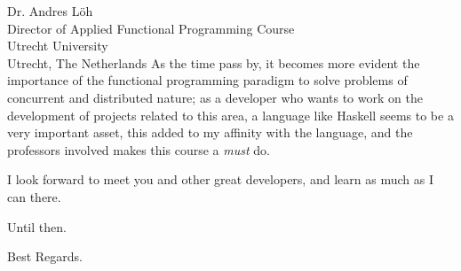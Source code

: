 \documentclass{letter} %
\begin{document}
\begin{letter}{Dr. Andres L\"oh \\
Director of Applied Functional Programming Course \\
Utrecht University \\
Utrecht, The Netherlands}
\noindent As the time pass by, it becomes more evident the importance of the functional programming paradigm 
to solve problems of concurrent and distributed nature; as a developer who wants to work on the development of 
projects related to this area, a language like Haskell seems to be a very important asset, this added to my 
affinity with the language, and the professors involved makes this course a \emph{must} do.
 
\noindent I look forward to meet you and other great developers, and learn as much as I can there.

Until then.

\closing{Best Regards.}

\end{letter}
 
\end{document}
